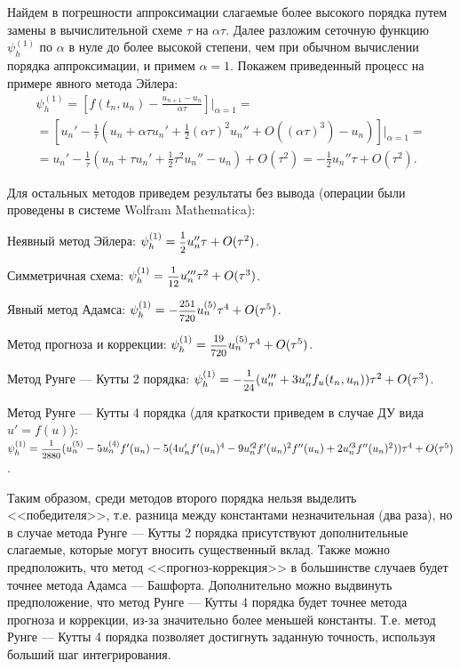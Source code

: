 \documentclass[12pt, a4paper]{article}
\begin{document}
\begin{enumerate}
		Найдем в погрешности аппроксимации слагаемые более высокого порядка путем замены в вычислительной схеме $\tau$ на $\alpha \tau$. Далее разложим сеточную функцию $\psi_h^{(1)}$ по $\alpha$ в нуле до более высокой степени, чем при обычном вычислении порядка аппроксимации, и примем $\alpha = 1$. Покажем приведенный процесс на примере явного метода Эйлера:
		\begin{multline*}
			\psi_h^{(1)} = \left[f(t_n, u_n) - \frac{u_{n+1}-u_n}{\alpha\tau}\right]\Bigg|_{\alpha = 1} = \\
			= \left[u_n' - \frac1\tau \left(u_n + \alpha\tau u_n' + \frac12(\alpha\tau)^2 u_n'' + O((\alpha\tau)^3) - u_n \right)\right]\Bigg|_{\alpha = 1} =\\
			= u_n' - \frac1\tau \left(u_n + \tau u_n' + \frac12\tau^2 u_n'' - u_n \right) + O(\tau^2) = -\frac12 u_n''\tau + O(\tau^2).
		\end{multline*}
		
		Для остальных методов приведем результаты без вывода (операции были проведены в системе Wolfram Mathematica):
		
		Неявный метод Эйлера: $\psi_h^{(1)} = \hbox{\footnotesize$\displaystyle\frac{1}{2}$} u_n''\tau + O(\tau^2)$.
		
		Симметричная схема: $\psi_h^{(1)} = \hbox{\footnotesize$\displaystyle\frac{1}{12}$} u_n'''\tau^2 + O(\tau^3)$.
		
		Явный метод Адамса: $\psi_h^{(1)} = -\hbox{\footnotesize$\displaystyle\frac{251}{720}$} u_n^{(5)}\tau^4 + O(\tau^5)$.
		
		Метод прогноза и коррекции: $\psi_h^{(1)} = \hbox{\footnotesize$\displaystyle\frac{19}{720}$} u_n^{(5)}\tau^4 + O(\tau^5)$.
		
		Метод Рунге --- Кутты 2 порядка: $\psi_h^{(1)} = -\hbox{\footnotesize$\displaystyle\frac{1}{24}$} (u_n''' + 3 u_n'' f_u(t_n, u_n))\tau^2 + O(\tau^3)$.
		
		Метод Рунге --- Кутты 4 порядка (для краткости приведем в случае ДУ вида $u' = f(u)$): $\psi_h^{(1)} = \hbox{\footnotesize$\displaystyle\frac{1}{2880}$}(u_n^{(5)} - 5 u_n^{(4)} f'(u_n) - 5(4 u_n' f'(u_n)^4 - 9 u_n'^2 f'(u_n)^2 f''(u_n) + 2 u_n'^3 f''(u_n)^2)) \tau ^4 + O(\tau^5)$.
		
		Таким образом, среди методов второго порядка нельзя выделить <<победителя>>, т.е. разница между константами незначительная (два раза), но в случае метода Рунге --- Кутты 2 порядка присутствуют дополнительные слагаемые, которые могут вносить существенный вклад. Также можно предположить, что метод <<прогноз-коррекция>> в большинстве случаев будет точнее метода Адамса --- Башфорта. Дополнительно можно выдвинуть предположение, что метод Рунге --- Кутты 4 порядка будет точнее метода прогноза и коррекции, из-за значительно более меньшей константы. Т.е. метод Рунге --- Кутты 4 порядка позволяет достигнуть заданную точность, используя больший шаг интегрирования.
		

\end{enumerate}
\end{document}
